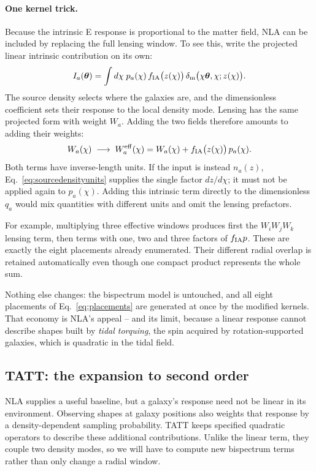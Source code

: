 \documentclass[11pt]{article}
\newcommand{\btheta}{\boldsymbol{\theta}}
\numberwithin{equation}{section}
\begin{document}
\paragraph{One kernel trick.}
Because the intrinsic E response is proportional to the matter field,
NLA can be included by replacing the full lensing window. To see this,
write the projected linear intrinsic contribution on its own:
\begin{equation}
  I_a(\btheta)=\int d\chi\;
  p_a(\chi)\,f_{\rm IA}\bigl(z(\chi)\bigr)\,
  \delta_{\rm m}\bigl(\chi\btheta,\chi;z(\chi)\bigr).
  \label{eq:intrinsicprojection}
\end{equation}
The source density selects where the galaxies are, and the dimensionless
coefficient sets their response to the local density mode. Lensing has
the same projected form with weight $W_a$. Adding the two fields therefore
amounts to adding their weights:
\begin{equation}
  W_a(\chi)\;\longrightarrow\;
  W_a^{\rm eff}(\chi)=W_a(\chi)
  + f_{\rm IA}\bigl(z(\chi)\bigr)\,p_a(\chi).
  \label{eq:nlakernel}
\end{equation}
Both terms have inverse-length units. If the input is instead $n_a(z)$,
Eq.~\eqref{eq:sourcedensityunits} supplies the single factor $dz/d\chi$;
it must not be applied again to $p_a(\chi)$. Adding this intrinsic term
directly to the dimensionless $q_a$ would mix quantities with different
units and omit the lensing prefactors.

For example, multiplying three effective windows produces first the
$W_iW_jW_k$ lensing term, then terms with one, two and three factors of
$f_{\rm IA}p$. These are exactly the eight placements already enumerated.
Their different radial overlap is retained automatically even though
one compact product represents the whole sum.

Nothing else changes: the bispectrum model is untouched, and all
eight placements of Eq.~\eqref{eq:placements} are generated at once
by the modified kernels.  That economy is NLA's appeal -- and its
limit, because a linear response cannot describe shapes built by
\emph{tidal torquing}, the spin acquired by rotation-supported
galaxies, which is quadratic in the tidal field.

\subsection{TATT: the expansion to second order}
\label{sec:tatt}

NLA supplies a useful baseline, but a galaxy's response need not be
linear in its environment. Observing shapes at galaxy positions also
weights that response by a density-dependent sampling probability.
TATT keeps specified quadratic operators to describe these additional
contributions. Unlike the linear term, they couple two density modes,
so we will have to compute new bispectrum terms rather than only change
a radial window.
\end{document}

